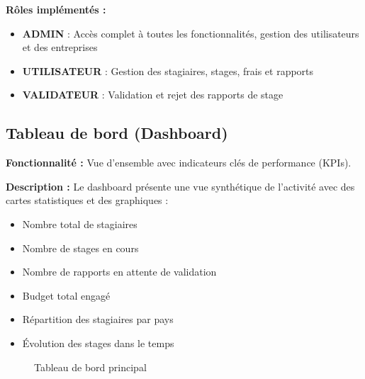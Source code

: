 \documentclass[12pt,a4paper]{report}
\begin{document}
\textbf{Rôles implémentés :}
\begin{itemize}[leftmargin=1cm]
    \item \textbf{ADMIN} : Accès complet à toutes les fonctionnalités, gestion des utilisateurs et des entreprises
    \item \textbf{UTILISATEUR} : Gestion des stagiaires, stages, frais et rapports
    \item \textbf{VALIDATEUR} : Validation et rejet des rapports de stage
\end{itemize}

\subsection{Tableau de bord (Dashboard)}

\textbf{Fonctionnalité :} Vue d'ensemble avec indicateurs clés de performance (KPIs).

\textbf{Description :} Le dashboard présente une vue synthétique de l'activité avec des cartes statistiques et des graphiques :

\begin{itemize}[leftmargin=1cm]
    \item Nombre total de stagiaires
    \item Nombre de stages en cours
    \item Nombre de rapports en attente de validation
    \item Budget total engagé
    \item Répartition des stagiaires par pays
    \item Évolution des stages dans le temps
\end{itemize}

\begin{figure}[H]
\centering
{}
\caption{Tableau de bord principal}
\end{figure}
\end{document}
